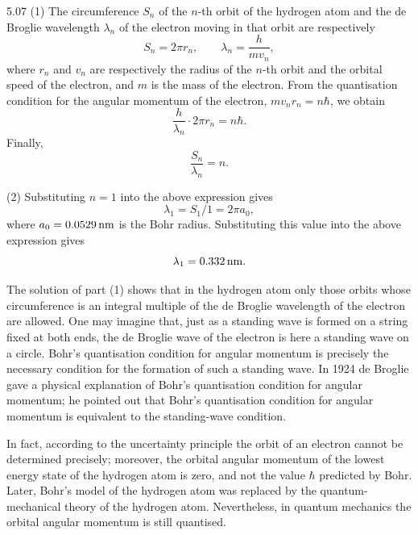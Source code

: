 \begin{solution}{5.07}
(1) The circumference $S_n$ of the $n$-th orbit of the hydrogen atom and the de Broglie
wavelength $\lambda_n$ of the electron moving in that orbit are respectively
\begin{equation*}
S_n = 2\pi r_n, \qquad \lambda_n = \frac{h}{mv_n},
\end{equation*}
where $r_n$ and $v_n$ are respectively the radius of the $n$-th orbit and the orbital speed of
the electron, and $m$ is the mass of the electron. From the quantisation condition for the
angular momentum of the electron, $mv_nr_n = n\hbar$, we obtain
\begin{equation*}
\frac{h}{\lambda_n}\cdot 2\pi r_n = n\hbar.
\end{equation*}
Finally,
\begin{equation*}
\frac{S_n}{\lambda_n} = n.
\end{equation*}

(2) Substituting $n = 1$ into the above expression gives
\begin{equation*}
\lambda_1 = S_1/1 = 2\pi a_0,
\end{equation*}
where $a_0 = 0.0529\,\mathrm{nm}$ is the Bohr radius. Substituting this value into the above
expression gives
\begin{equation*}
\lambda_1 = 0.332\,\mathrm{nm}.
\end{equation*}

\begin{commentary}
The solution of part (1) shows that in the hydrogen atom only those orbits whose
circumference is an integral multiple of the de Broglie wavelength of the electron are
allowed. One may imagine that, just as a standing wave is formed on a string fixed at both
ends, the de Broglie wave of the electron is here a standing wave on a circle. Bohr's
quantisation condition for angular momentum is precisely the necessary condition for the
formation of such a standing wave. In 1924 de Broglie gave a physical explanation of Bohr's
quantisation condition for angular momentum; he pointed out that Bohr's quantisation
condition for angular momentum is equivalent to the standing-wave condition.

In fact, according to the uncertainty principle the orbit of an electron cannot be determined
precisely; moreover, the orbital angular momentum of the lowest energy state of the hydrogen
atom is zero, and not the value $\hbar$ predicted by Bohr. Later, Bohr's model of the hydrogen
atom was replaced by the quantum-mechanical theory of the hydrogen atom. Nevertheless, in
quantum mechanics the orbital angular momentum is still quantised.
\end{commentary}
\end{solution}

